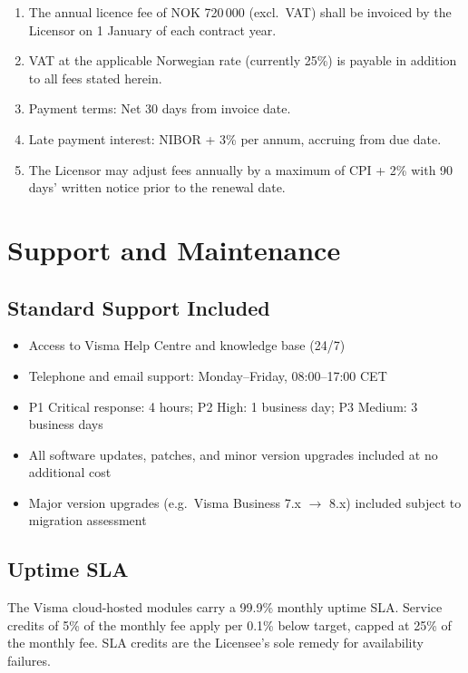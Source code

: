 \documentclass[a4paper,11pt]{article}
\begin{document}
\begin{enumerate}[leftmargin=*, label=\arabic{*}.]
  \item The annual licence fee of NOK 720\,000 (excl.\ VAT) shall be invoiced by the
    Licensor on 1 January of each contract year.
  \item VAT at the applicable Norwegian rate (currently 25\%) is payable in addition to
    all fees stated herein.
  \item Payment terms: Net 30 days from invoice date.
  \item Late payment interest: NIBOR + 3\% per annum, accruing from due date.
  \item The Licensor may adjust fees annually by a maximum of CPI + 2\% with 90 days'
    written notice prior to the renewal date.
\end{enumerate}

\section{Support and Maintenance}

\subsection{Standard Support Included}
\begin{itemize}[leftmargin=*]
  \item Access to Visma Help Centre and knowledge base (24/7)
  \item Telephone and email support: Monday--Friday, 08:00--17:00 CET
  \item P1 Critical response: 4 hours; P2 High: 1 business day; P3 Medium: 3 business days
  \item All software updates, patches, and minor version upgrades included at no additional cost
  \item Major version upgrades (e.g.\ Visma Business 7.x $\to$ 8.x) included subject to
    migration assessment
\end{itemize}

\subsection{Uptime SLA}
The Visma cloud-hosted modules carry a 99.9\% monthly uptime SLA. Service credits of 5\% of the
monthly fee apply per 0.1\% below target, capped at 25\% of the monthly fee. SLA credits are
the Licensee's sole remedy for availability failures.
\end{document}
